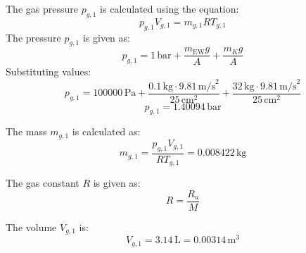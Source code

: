 The gas pressure \( p_{g,1} \) is calculated using the equation:  
\[
p_{g,1} V_{g,1} = m_{g,1} R T_{g,1}
\]  
The pressure \( p_{g,1} \) is given as:  
\[
p_{g,1} = 1 \, \text{bar} + \frac{m_{\text{EW}} g}{A} + \frac{m_K g}{A}
\]  
Substituting values:  
\[
p_{g,1} = 100000 \, \text{Pa} + \frac{0.1 \, \text{kg} \cdot 9.81 \, \text{m/s}^2}{25 \, \text{cm}^2} + \frac{32 \, \text{kg} \cdot 9.81 \, \text{m/s}^2}{25 \, \text{cm}^2}
\]  
\[
p_{g,1} = 1.40094 \, \text{bar}
\]  

The mass \( m_{g,1} \) is calculated as:  
\[
m_{g,1} = \frac{p_{g,1} V_{g,1}}{R T_{g,1}} = 0.008422 \, \text{kg}
\]  

The gas constant \( R \) is given as:  
\[
R = \frac{R_u}{M}
\]  

The volume \( V_{g,1} \) is:  
\[
V_{g,1} = 3.14 \, \text{L} = 0.00314 \, \text{m}^3
\]